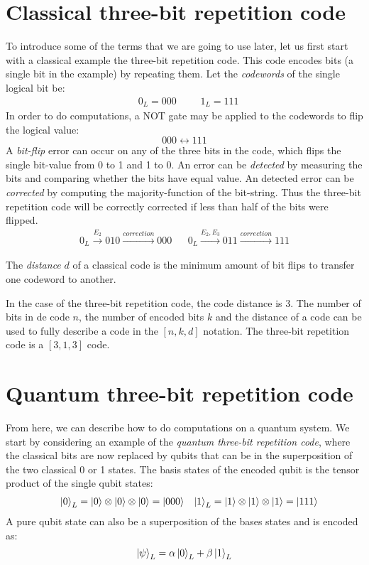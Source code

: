 \section{Classical three-bit repetition code}\label{sec:classical3bit}
To introduce some of the terms that we are going to use later, let us first start with a classical example the three-bit repetition code. This code encodes bits (a single bit in the example) by repeating them. Let the \emph{codewords} of the single logical bit be:
\begin{align}\label{eq:qb_3bitlogical}
    && 0_L = 000 &&& 1_L=111 &
\end{align}
In order to do computations, a NOT gate may be applied to the codewords to flip the logical value:
\begin{equation}
 000 \leftrightarrow 111
\end{equation}
A \emph{bit-flip} error can occur on any of the three bits in the code, which flips the single bit-value from 0 to 1 and 1 to 0. An error can be \emph{detected} by measuring the bits and comparing whether the bits have equal value. An detected error can be \emph{corrected} by computing the majority-function of the bit-string. Thus the three-bit repetition code will be correctly corrected if less than half of the bits were flipped.
\begin{align}
  0_L \xrightarrow{E_2} 010 \xrightarrow{correction} 000 && 0_L \xrightarrow{E_2, E_3} 011 \xrightarrow{correction} 111
\end{align}
\begin{definition}\label{def:distance}
  The \emph{distance} $d$ of a classical code is the minimum amount of bit flips to transfer one codeword to another. 
\end{definition}
In the case of the three-bit repetition code, the code distance is 3. The number of bits in de code $n$, the number of encoded bits $k$ and the distance of a code can be used to fully describe a code in the $[n, k, d]$ notation. The three-bit repetition code is a $[3,1,3]$ code.

\section{Quantum three-bit repetition code}\label{sec:quantum3bit}

From here, we can describe how to do computations on a quantum system. We start by considering an example of the \emph{quantum three-bit repetition code}, where the classical bits are now replaced by qubits that can be in the superposition of the two classical 0 or 1 states. The basis states of the encoded qubit is the tensor product of the single qubit states:
\begin{align}\label{eq:qb_3bitlogicalq}
&& \ket{0}_L = \ket{0}\otimes\ket{0}\otimes\ket{0} = \ket{000} && \ket{1}_L = \ket{1}\otimes\ket{1}\otimes\ket{1} = \ket{111}
\end{align}
A pure qubit state can also be a superposition of the bases states and is encoded as:
\begin{equation}\label{eq:qec_3bitstate}
  \ket{\psi}_L = \alpha\ket{0}_L + \beta\ket{1}_L
\end{equation}

